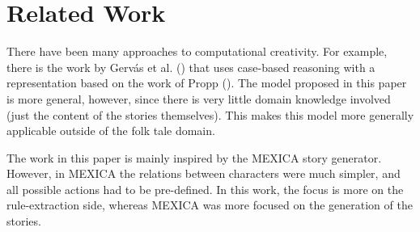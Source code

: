 \section{Related Work}

There have been many approaches to computational creativity. For example, there
is the work by Gerv\'as et al. (\cite{Gervas2005235}) that uses case-based
reasoning with a representation based on the work of Propp (\cite{propp1968morphology}).
The model proposed in this paper is more general, however, since there is very
little domain knowledge involved (just the content of the stories themselves).
This makes this model more generally applicable outside of the folk tale domain.

The work in this paper is mainly inspired by the MEXICA story generator. %
However, in MEXICA the relations between characters were much simpler, and 
all possible actions had to be pre-defined. In this work, the focus is more on
the rule-extraction side, whereas MEXICA was more focused on the generation of
the stories.
